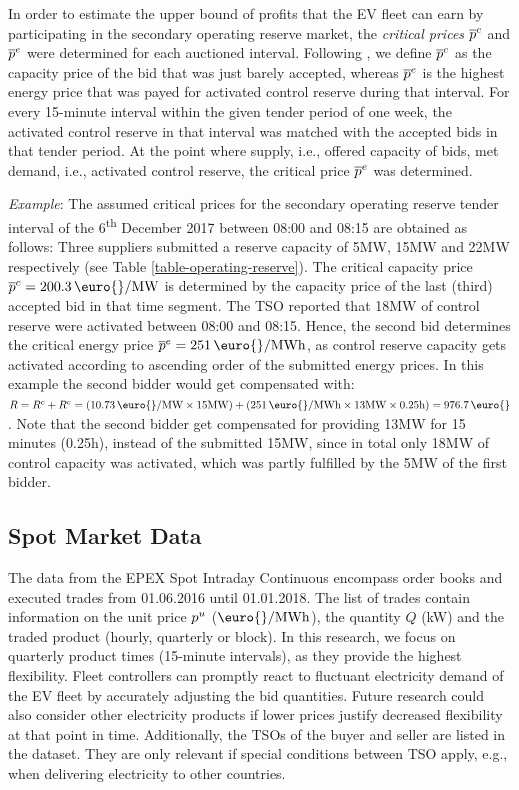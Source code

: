 \documentclass[a4paper, 12pt]{article}
\let\textcite\shortciteA
\begin{document}
In order to estimate the upper bound of profits that the EV fleet can earn by
participating in the secondary operating reserve market, the \emph{critical prices}
\(\overline p^c_{}\) and \(\overline p^e_{}\) were determined for each auctioned
interval. Following \textcite{brandt17_evaluat_busin_model_vehic_grid_integ}, we
define \(\overline p^c_{}\) as the capacity price of the bid that was just barely
accepted, whereas \(\overline p^e_{}\) is the highest energy price that was payed
for activated control reserve during that interval. For every
15-minute interval within the given tender period of one week, the activated
control reserve in that interval was matched with the accepted bids in that
tender period. At the point where supply, i.e., offered capacity of bids, met
demand, i.e., activated control reserve, the critical price \(\overline p^e_{}\) was
determined.

\emph{Example}: The assumed critical prices for the secondary operating reserve
tender interval of the 6\textsuperscript{th} December 2017 between 08:00 and 08:15 are obtained
as follows: Three suppliers submitted a reserve capacity of 5MW, 15MW and 22MW
respectively (see Table \ref{table-operating-reserve}). The critical capacity
price \(\ccp{} = 200.3 \text{ \!\euro{}/MW}\) is determined by the
capacity price of the last (third) accepted bid in that time segment. The TSO
reported that 18MW of control reserve were activated between 08:00 and 08:15.
Hence, the second bid determines the critical energy price \(\cep{} = 251
\text{ \!\euro{}/MWh}\), as control reserve capacity gets activated according to
ascending order of the submitted energy prices. In this example the second
bidder would get compensated with: \(R = R^c + R^e =(10.73
\text{ \!\euro{}/MW}\times15\text{MW}) + (251
\text{ \!\euro{}/MWh}\times13\text{MW}\times 0.25\text{h}) =
976.7\text{ \!\euro{}}\). Note that the second bidder get compensated for
providing 13MW for 15 minutes (0.25h), instead of the submitted 15MW, since in
total only 18MW of control capacity was activated, which was partly fulfilled
by the 5MW of the first bidder.

\subsection{Spot Market Data}
\label{sec:org8969d70}
The data from the EPEX Spot Intraday Continuous encompass order books and
executed trades from 01.06.2016 until 01.01.2018. The list of trades contain
information on the unit price \(p^u_{}\) (\(\text{\euro{}/MWh}\)), the quantity \(Q\)
(kW) and the traded product (hourly, quarterly or block). In this research, we
focus on quarterly product times (15-minute intervals), as they provide the
highest flexibility. Fleet controllers can promptly react to fluctuant
electricity demand of the EV fleet by accurately adjusting the bid quantities.
Future research could also consider other electricity products if lower prices
justify decreased flexibility at that point in time. Additionally, the TSOs of
the buyer and seller are listed in the dataset. They are only relevant if
special conditions between TSO apply, e.g., when delivering electricity to other
countries.
\end{document}
